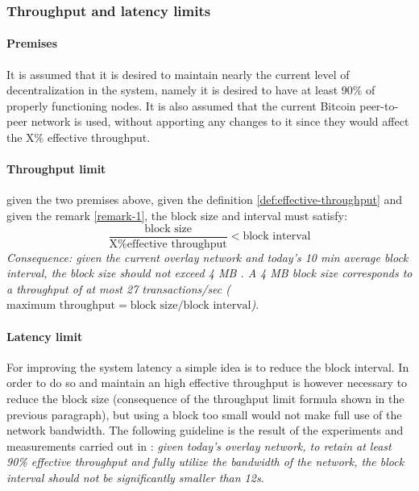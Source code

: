 
\subsubsection{Throughput and latency limits}

\paragraph{Premises} It is assumed that it is desired to maintain nearly the
current level of decentralization in the system, namely it is desired to have at
least 90\% of properly functioning nodes. It is also assumed that the current
Bitcoin peer-to-peer network is used, without apporting any changes to it since
they would affect the X\% effective throughput.

\paragraph{Throughput limit} given the two premises above, given the definition
\ref{def:effective-throughput} and given the remark \ref{remark-1}, the block size and
interval must satisfy:
\[ \frac{\text{block size}}{\text{X\% effective throughput}} < \text{block interval} \]
\emph{Consequence: given the current overlay network and today’s 10 min average
block interval, the block size should not exceed 4 MB \cite{croman-scaling-blockchain}.
A 4 MB block size corresponds to a throughput of at most 27 transactions/sec
($\text{maximum throughput} = \text{block size} / \text{block interval}$)}.


\paragraph{Latency limit} For improving the system latency a simple idea is to
reduce the block interval. In order to do so and maintain an high effective
throughput is however necessary to reduce the block size (consequence of the
throughput limit formula shown in the previous paragraph), but using a block too
small would not make full use of the network bandwidth. The following guideline
is the result of the experiments and measurements carried out in
\cite{croman-scaling-blockchain}:  \emph{given today’s overlay network, to retain at
least 90\% effective throughput and fully utilize the bandwidth of the network,
the block interval should not be significantly smaller than 12s.}





